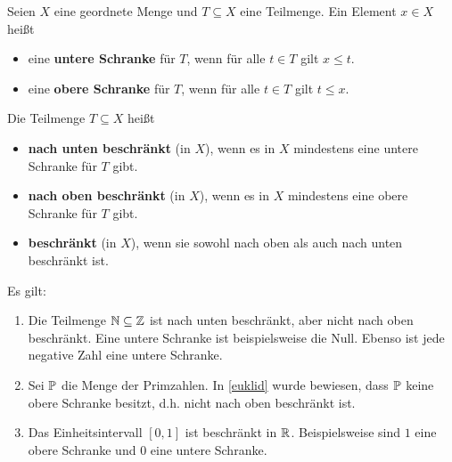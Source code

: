 \begin{defin}[Schranken] \label{def:schranken}  
    Seien $X$ eine geordnete Menge und $T\subseteq X$ eine Teilmenge. Ein Element $x\in X$ heißt
    \begin{itemize}
        \item eine \textbf{untere Schranke} für $T$, wenn für alle $t\in T$ gilt $x\le t$.
        \item eine \textbf{obere Schranke} für $T$, wenn für alle $t\in T$ gilt $t\le x$.
    \end{itemize}
    Die Teilmenge $T\subseteq X$ heißt
    \begin{itemize}
        \item \textbf{nach unten beschränkt} (in $X$), wenn es in $X$ mindestens eine untere Schranke für $T$ gibt.
        \item \textbf{nach oben beschränkt} (in $X$), wenn es in $X$ mindestens eine obere Schranke für $T$ gibt.
        \item \textbf{beschränkt} (in $X$), wenn sie sowohl nach oben als auch nach unten beschränkt ist.
    \end{itemize}
\end{defin}


\begin{bsp}
    Es gilt:
    \begin{enumerate}
        \item Die Teilmenge $\mathbb N\subseteq \mathbb Z$ ist nach unten beschränkt, aber nicht nach oben beschränkt. Eine untere Schranke ist beispielsweise die Null. Ebenso ist jede negative Zahl eine untere Schranke.
        \item Sei $\mathbb P$ die Menge der Primzahlen. In \cref{euklid} wurde bewiesen, dass $\mathbb P$ keine obere Schranke besitzt, d.h. nicht nach oben beschränkt ist.
        \item Das Einheitsintervall $[0,1]$ ist beschränkt in $\mathbb R$. Beispielsweise sind $1$ eine obere Schranke und $0$ eine untere Schranke.
    \end{enumerate}
\end{bsp}


